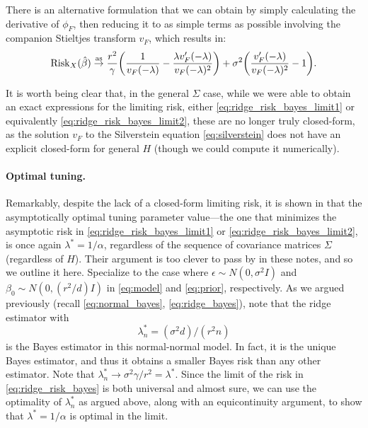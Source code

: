 \documentclass{article}
\begin{document}
There is an alternative formulation that we can obtain by simply calculating the 
derivative of $\phi_F$, then reducing it to as simple terms as possible
involving the companion Stieltjes transform $v_F$, which results in:     
\begin{equation}
\label{eq:ridge_risk_bayes_limit2}
\mathrm{Risk}_X(\hat{\beta}) \overset{\mathrm{as}}{\to} \frac{r^2}{\gamma} \bigg( \frac{1}{v_F(-\lambda)} -
  \frac{\lambda v'_F(-\lambda)}{v_F(-\lambda)^2} \bigg) + \sigma^2 \bigg( 
  \frac{v'_F(-\lambda)}{v_F(-\lambda)^2} - 1 \bigg).
\end{equation}

It is worth being clear that, in the general $\Sigma$ case, while we were able
to obtain an exact expressions for the limiting risk, either
\eqref{eq:ridge_risk_bayes_limit1} or equivalently
\eqref{eq:ridge_risk_bayes_limit2}, these are no longer truly closed-form, as
the solution $v_F$ to the Silverstein equation \eqref{eq:silverstein} does not
have an explicit closed-form for general $H$ (though we could compute it
numerically).  

\paragraph{Optimal tuning.}

Remarkably, despite the lack of a closed-form limiting risk, it is shown in
\citet{dobriban2018high} that the asymptotically optimal tuning parameter
value---the one that minimizes the asymptotic risk in
\eqref{eq:ridge_risk_bayes_limit1} or \eqref{eq:ridge_risk_bayes_limit2}, is
once again $\lambda^* = 1/\alpha$, regardless of the sequence of covariance
matrices $\Sigma$ (regardless of $H$). Their argument is too clever to pass by
in these notes, and so we outline it here. Specialize to the case where
$\epsilon \sim N(0,\sigma^2 I)$ and $\beta_0 \sim N(0, (r^2/d) I)$ in
\eqref{eq:model} and \eqref{eq:prior}, respectively. As we argued previously
(recall \eqref{eq:normal_bayes}, \eqref{eq:ridge_bayes}), note that the ridge
estimator with
\[
\lambda^*_n = (\sigma^2 d)/(r^2 n)
\]
is the Bayes estimator in this normal-normal model. In fact, it is the unique
Bayes estimator, and thus it obtains a smaller Bayes risk than any other
estimator. Note that $\lambda^*_n \to \sigma^2 \gamma / r^2= \lambda^*$. Since 
the limit of the risk in \eqref{eq:ridge_risk_bayes} is both universal and
almost sure, we can use the optimality of $\lambda^*_n$ as argued above, along
with an equicontinuity argument, to show that $\lambda^* = 1/\alpha$ is optimal
in the limit.  
\end{document}
